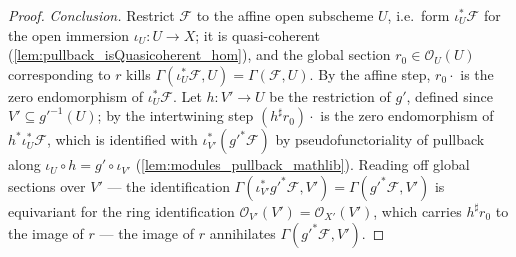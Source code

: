 \begin{proof}
  \emph{Conclusion.}  Restrict \(\mathcal{F}\) to the affine open subscheme
  \(U\), i.e.\ form \(\iota_U^* \mathcal{F}\) for the open immersion
  \(\iota_U : U \to X\); it is quasi-coherent
  (\cref{lem:pullback_isQuasicoherent_hom}), and the global section
  \(r_0 \in \mathcal{O}_U(U)\) corresponding to \(r\) kills
  \(\Gamma(\iota_U^* \mathcal{F}, U) = \Gamma(\mathcal{F}, U)\).  By the
  affine step, \(r_0 \cdot\) is the zero endomorphism of
  \(\iota_U^* \mathcal{F}\).  Let \(h : V' \to U\) be the restriction of
  \(g'\), defined since \(V' \subseteq g'^{-1}(U)\); by the intertwining step
  \((h^\sharp r_0) \cdot\) is the zero endomorphism of
  \(h^* \iota_U^* \mathcal{F}\), which is identified with
  \(\iota_{V'}^* (g'^* \mathcal{F})\) by pseudofunctoriality of pullback
  along \(\iota_U \circ h = g' \circ \iota_{V'}\)
  (\cref{lem:modules_pullback_mathlib}).  Reading off global sections over
  \(V'\) — the identification
  \(\Gamma(\iota_{V'}^* g'^* \mathcal{F}, V') = \Gamma(g'^* \mathcal{F}, V')\)
  is equivariant for the ring identification
  \(\mathcal{O}_{V'}(V') = \mathcal{O}_{X'}(V')\), which carries
  \(h^\sharp r_0\) to the image of \(r\) — the image of \(r\) annihilates
  \(\Gamma(g'^* \mathcal{F}, V')\).
\end{proof}


